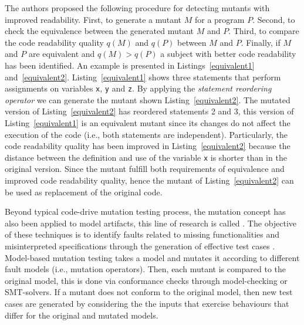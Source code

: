 The authors proposed the following procedure for detecting mutants with improved readability. 
First, to generate a mutant $M$ for a program $P$. Second, to check the equivalence between the generated mutant $M$ and $P$. Third, to compare the code readability quality $q(M)$ and $q(P)$ between $M$ and $P$. Finally, if $M$ and $P$ are equivalent and $q(M) > q(P)$ a subject with better code readability has been identified. An example is presented in Listings~\ref{equivalent1} and~\ref{equivalent2}.
Listing~\ref{equivalent1} shows three statements that perform assignments on variables \texttt{x}, \texttt{y} and \texttt{z}. By applying the \textit{statement reordering operator} we can generate the mutant shown Listing~\ref{equivalent2}. The mutated version of Listing~\ref{equivalent2} has reordered statements 2 and 3, this version of Listing~\ref{equivalent1} is an equivalent mutant since its changes do not affect the execution of the code (i.e., both statements are independent). 
Particularly, the code readability quality has been improved in Listing~\ref{equivalent2} because the distance between the definition and use of the variable \texttt{x} is shorter than in the original version. 
Since the mutant fulfill both requirements of equivalence and improved code readability quality, hence the mutant of Listing~\ref{equivalent2} can be used as replacement of the original code.




Beyond typical code-drive mutation testing process, the mutation concept has also been applied to model artifacts, this line of research is called . The objective of these techniques is to identify faults related to missing functionalities and misinterpreted specifications through the generation of effective test cases \cite{devroey2016featured,belli2016model}.
Model-based mutation testing takes a model and mutates it according to different fault models (i.e., mutation operators). Then, each mutant is compared to the original model, this is done via conformance checks through model-checking or SMT-solvers. If a mutant does not conform to the original model, then new test cases are generated by considering the the inputs that exercise behaviours that differ for the original and mutated models\cite{8411732}.

